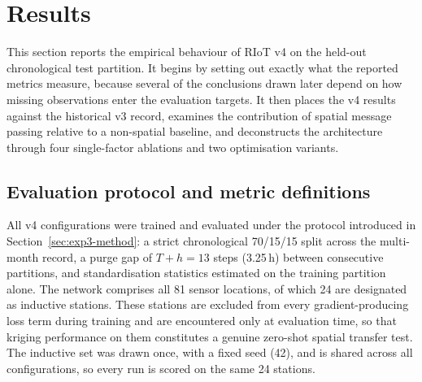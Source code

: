 
\section{Results}
\label{sec:exp3-results}

This section reports the empirical behaviour of RIoT v4 on the held-out
chronological test partition. It begins by setting out exactly what the
reported metrics measure, because several of the conclusions drawn later
depend on how missing observations enter the evaluation targets. It then
places the v4 results against the historical v3 record, examines the
contribution of spatial message passing relative to a non-spatial
baseline, and deconstructs the architecture through four single-factor
ablations and two optimisation variants.

\subsection{Evaluation protocol and metric definitions}
\label{sec:exp3-protocol}

All v4 configurations were trained and evaluated under the protocol
introduced in Section~\ref{sec:exp3-method}: a strict chronological
70/15/15 split across the multi-month record, a purge gap of
$T + h = 13$ steps (3.25\,h) between consecutive partitions, and
standardisation statistics estimated on the training partition alone.
The network comprises all 81 sensor locations, of which 24 are designated
as inductive stations. These stations are excluded from every
gradient-producing loss term during training and are encountered only at
evaluation time, so that kriging performance on them constitutes a
genuine zero-shot spatial transfer test. The inductive set was drawn
once, with a fixed seed (42), and is shared across all configurations,
so every run is scored on the same 24 stations.

